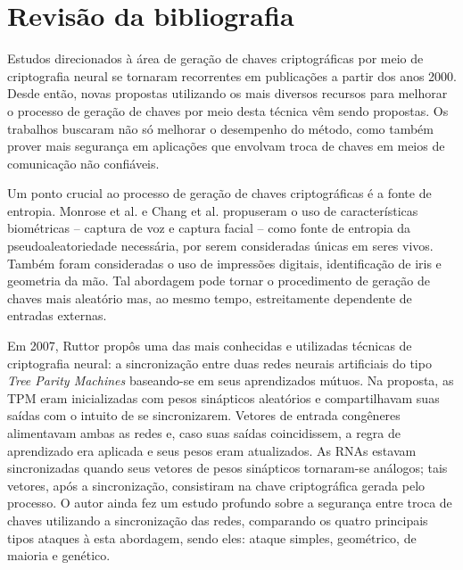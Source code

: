 \documentclass[a4paper,10pt,oneside,conference,final,keeplastbox]{inatel}
\begin{document}
            
  
    \section{Revisão da bibliografia}
    \label{sec:revisao_da_bibliografia}
  
        Estudos direcionados à área de geração de chaves criptográficas por meio de criptografia neural se tornaram recorrentes em publicações a partir dos anos 2000. Desde então, novas propostas utilizando os mais diversos recursos para melhorar o processo de geração de chaves por meio desta técnica vêm sendo propostas. Os trabalhos buscaram não só melhorar o desempenho do método, como também prover mais segurança em aplicações que envolvam troca de chaves em meios de comunicação não confiáveis.
    
        Um ponto crucial ao processo de geração de chaves criptográficas é a fonte de entropia. Monrose et al. \cite{monrose2001voice} e Chang et al. \cite{chang2004biometrics} propuseram o uso de características biométricas -- captura de voz e captura facial -- como fonte de entropia da pseudoaleatoriedade necessária, por serem consideradas únicas em seres vivos. Também foram consideradas o uso de impressões digitais, identificação de iris e geometria da mão. Tal abordagem pode tornar o procedimento de geração de chaves mais aleatório mas, ao mesmo tempo, estreitamente dependente de entradas externas.
        
        Em 2007, Ruttor \cite{ruttor2007neural} propôs uma das mais conhecidas e utilizadas técnicas de criptografia neural: a sincronização entre duas redes neurais artificiais do tipo \textit{Tree Parity Machines} baseando-se em seus aprendizados mútuos. Na proposta, as TPM eram inicializadas com pesos sinápticos aleatórios e compartilhavam suas saídas com o intuito de se sincronizarem. Vetores de entrada congêneres alimentavam ambas as redes e, caso suas saídas coincidissem, a regra de aprendizado era aplicada e seus pesos eram atualizados. As RNAs estavam sincronizadas quando seus vetores de pesos sinápticos tornaram-se análogos; tais vetores, após a sincronização, consistiram na chave criptográfica gerada pelo processo. O autor ainda fez um estudo profundo sobre a segurança entre troca de chaves utilizando a sincronização das redes, comparando os quatro principais tipos ataques à esta abordagem, sendo eles: ataque simples, geométrico, de maioria e genético.
        
\end{document}
